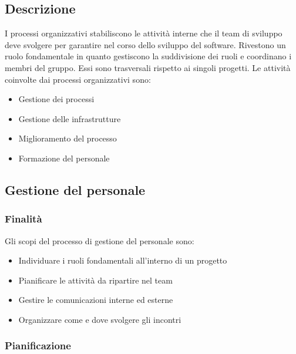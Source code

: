 \documentclass[../norme-di-progetto.tex]{subfiles}
\begin{document}
\subsection{Descrizione}
\label{sub:Descrizione}
I processi organizzativi stabiliscono le attività interne che il team di sviluppo deve svolgere per garantire  nel corso dello sviluppo del software. Rivestono un ruolo fondamentale in quanto gestiscono la suddivisione dei ruoli e coordinano i membri del gruppo. Essi sono trasversali rispetto ai singoli progetti.
Le attività coinvolte dai processi organizzativi sono:
\begin{itemize}
	\item Gestione dei processi
	\item Gestione delle infrastrutture
	\item Miglioramento del processo
	\item Formazione del personale
\end{itemize}
\subsection{Gestione del personale}
\label{sub:gestione del personale}
\subsubsection{Finalità}
\label{subs:finalità}
Gli scopi del processo di gestione del personale sono:
\begin{itemize}
	\item Individuare i ruoli fondamentali all'interno di un progetto
	\item Pianificare le attività da ripartire nel team
	\item Gestire le comunicazioni interne ed esterne
	\item Organizzare come e dove svolgere gli incontri
\end{itemize}
\subsubsection{Pianificazione}
\end{document}
